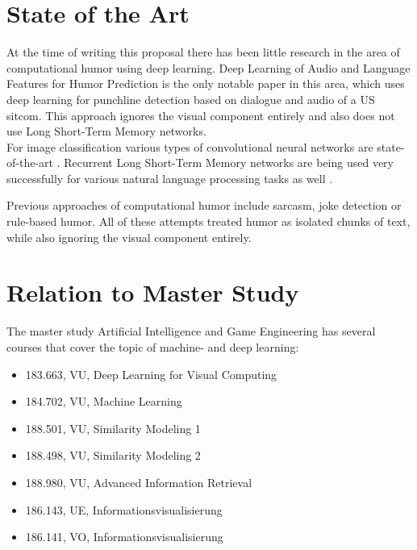 \documentclass[draft,final]{vutinfth} %
\begin{document}
\chapter{State of the Art}

At the time of writing this proposal there has been little research in the area of computational humor using deep learning. Deep Learning of Audio and Language Features for Humor Prediction \cite{Bertero2016DeepLO} is the only notable paper in this area, which uses deep learning for punchline detection based on dialogue and audio of a US sitcom. This approach ignores the visual component entirely and also does not use Long Short-Term Memory networks. \\

For image classification various types of convolutional neural networks are state-of-the-art \cite{dogsvscats}. Recurrent Long Short-Term Memory networks are being used very successfully for various natural language processing tasks as well \cite[page 4]{reviewRNN}. \\
\pagebreak

Previous approaches of computational humor include sarcasm\cite{Bamman2015ContextualizedSD}, joke detection\cite{Yang2015HumorRA} or rule-based humor\cite{HumoristBot}. All of these attempts treated humor as isolated chunks of text, while also ignoring the visual component entirely.

\chapter{Relation to Master Study}
The master study Artificial Intelligence and Game Engineering has several courses that cover the topic of machine- and deep learning:

\begin{itemize}
\item 183.663, VU, Deep  Learning  for  Visual  Computing
\item 184.702, VU, Machine Learning
\item 188.501, VU, Similarity Modeling 1
\item 188.498, VU, Similarity Modeling 2
\item 188.980, VU, Advanced Information Retrieval
\item 186.143, UE, Informationsvisualisierung 
\item 186.141, VO, Informationsvisualisierung 
\end{itemize}

\end{document}
